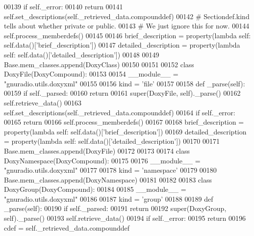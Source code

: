 \begin{DoxyCode}
{00139         \textcolor{keywordflow}{if} self.\_error:
00140             \textcolor{keywordflow}{return}
00141         self.set_descriptions(self.\_retrieved\_data.compounddef)
00142         \textcolor{comment}{# Sectiondef.kind tells about whether private or public.}
00143         \textcolor{comment}{# We just ignore this for now.}
00144         self.process\_memberdefs()
00145 
00146     brief\_description = property(\textcolor{keyword}{lambda} self: self.data()[\textcolor{stringliteral}{'brief\_description'}])
00147     detailed\_description = property(\textcolor{keyword}{lambda} self: self.data()[\textcolor{stringliteral}{'detailed\_description'}])
00148 
00149 Base.mem\_classes.append(DoxyClass)
00150 
00151 
00152 \textcolor{keyword}{class }DoxyFile(DoxyCompound):
00153 
00154     \_\_module\_\_ = \textcolor{stringliteral}{"gnuradio.utils.doxyxml"}
00155 
00156     kind = \textcolor{stringliteral}{'file'}
00157 
00158     \textcolor{keyword}{def }_parse(self):
00159         \textcolor{keywordflow}{if} self.\_parsed:
00160             \textcolor{keywordflow}{return}
00161         super(DoxyFile, self)._parse()
00162         self.retrieve\_data()
00163         self.set_descriptions(self.\_retrieved\_data.compounddef)
00164         \textcolor{keywordflow}{if} self.\_error:
00165             \textcolor{keywordflow}{return}
00166         self.process\_memberdefs()
00167 
00168     brief\_description = property(\textcolor{keyword}{lambda} self: self.data()[\textcolor{stringliteral}{'brief\_description'}])
00169     detailed\_description = property(\textcolor{keyword}{lambda} self: self.data()[\textcolor{stringliteral}{'detailed\_description'}])
00170 
00171 Base.mem\_classes.append(DoxyFile)
00172 
00173 
00174 \textcolor{keyword}{class }DoxyNamespace(DoxyCompound):
00175 
00176     \_\_module\_\_ = \textcolor{stringliteral}{"gnuradio.utils.doxyxml"}
00177 
00178     kind = \textcolor{stringliteral}{'namespace'}
00179 
00180 Base.mem\_classes.append(DoxyNamespace)
00181 
00182 
00183 \textcolor{keyword}{class }DoxyGroup(DoxyCompound):
00184 
00185     \_\_module\_\_ = \textcolor{stringliteral}{"gnuradio.utils.doxyxml"}
00186 
00187     kind = \textcolor{stringliteral}{'group'}
00188 
00189     \textcolor{keyword}{def }_parse(self):
00190         \textcolor{keywordflow}{if} self.\_parsed:
00191             \textcolor{keywordflow}{return}
00192         super(DoxyGroup, self)._parse()
00193         self.retrieve\_data()
00194         \textcolor{keywordflow}{if} self.\_error:
00195             \textcolor{keywordflow}{return}
00196         cdef = self.\_retrieved\_data.compounddef
}
\end{DoxyCode}

